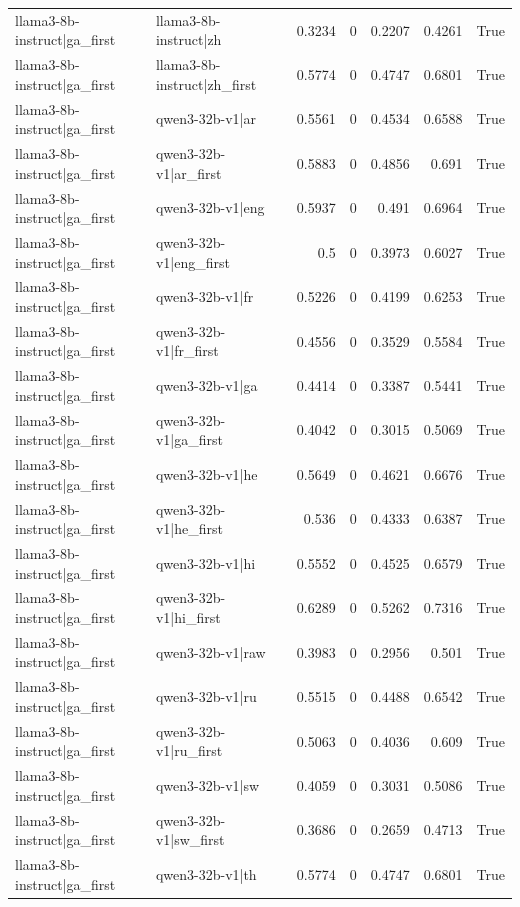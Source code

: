 \begin{table}
\begin{tabular}{l l r r r r l}
llama3-8b-instruct|ga_first & llama3-8b-instruct|zh & 0.3234 & 0 & 0.2207 & 0.4261 & True \\
llama3-8b-instruct|ga_first & llama3-8b-instruct|zh_first & 0.5774 & 0 & 0.4747 & 0.6801 & True \\
llama3-8b-instruct|ga_first & qwen3-32b-v1|ar & 0.5561 & 0 & 0.4534 & 0.6588 & True \\
llama3-8b-instruct|ga_first & qwen3-32b-v1|ar_first & 0.5883 & 0 & 0.4856 & 0.691 & True \\
llama3-8b-instruct|ga_first & qwen3-32b-v1|eng & 0.5937 & 0 & 0.491 & 0.6964 & True \\
llama3-8b-instruct|ga_first & qwen3-32b-v1|eng_first & 0.5 & 0 & 0.3973 & 0.6027 & True \\
llama3-8b-instruct|ga_first & qwen3-32b-v1|fr & 0.5226 & 0 & 0.4199 & 0.6253 & True \\
llama3-8b-instruct|ga_first & qwen3-32b-v1|fr_first & 0.4556 & 0 & 0.3529 & 0.5584 & True \\
llama3-8b-instruct|ga_first & qwen3-32b-v1|ga & 0.4414 & 0 & 0.3387 & 0.5441 & True \\
llama3-8b-instruct|ga_first & qwen3-32b-v1|ga_first & 0.4042 & 0 & 0.3015 & 0.5069 & True \\
llama3-8b-instruct|ga_first & qwen3-32b-v1|he & 0.5649 & 0 & 0.4621 & 0.6676 & True \\
llama3-8b-instruct|ga_first & qwen3-32b-v1|he_first & 0.536 & 0 & 0.4333 & 0.6387 & True \\
llama3-8b-instruct|ga_first & qwen3-32b-v1|hi & 0.5552 & 0 & 0.4525 & 0.6579 & True \\
llama3-8b-instruct|ga_first & qwen3-32b-v1|hi_first & 0.6289 & 0 & 0.5262 & 0.7316 & True \\
llama3-8b-instruct|ga_first & qwen3-32b-v1|raw & 0.3983 & 0 & 0.2956 & 0.501 & True \\
llama3-8b-instruct|ga_first & qwen3-32b-v1|ru & 0.5515 & 0 & 0.4488 & 0.6542 & True \\
llama3-8b-instruct|ga_first & qwen3-32b-v1|ru_first & 0.5063 & 0 & 0.4036 & 0.609 & True \\
llama3-8b-instruct|ga_first & qwen3-32b-v1|sw & 0.4059 & 0 & 0.3031 & 0.5086 & True \\
llama3-8b-instruct|ga_first & qwen3-32b-v1|sw_first & 0.3686 & 0 & 0.2659 & 0.4713 & True \\
llama3-8b-instruct|ga_first & qwen3-32b-v1|th & 0.5774 & 0 & 0.4747 & 0.6801 & True \\

\end{tabular}
\end{table}
